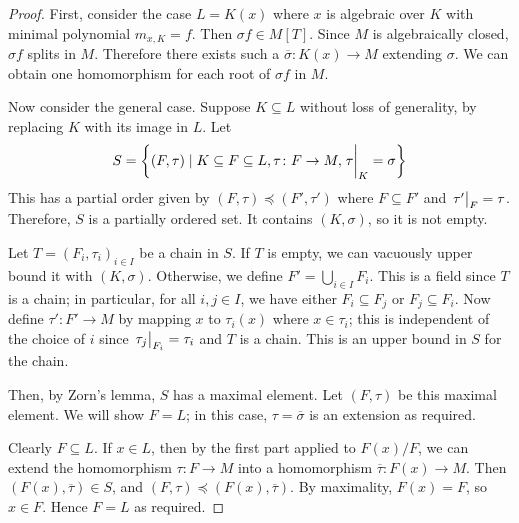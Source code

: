 \begin{proof}
	First, consider the case \( L = K(x) \) where \( x \) is algebraic over \( K \) with minimal polynomial \( m_{x,K} = f \).
	Then \( \sigma f \in M[T] \).
	Since \( M \) is algebraically closed, \( \sigma f \) splits in \( M \).
	Therefore there exists such a \( \overline \sigma \colon K(x) \to M \) extending \( \sigma \).
	We can obtain one homomorphism for each root of \( \sigma f \) in \( M \).

	Now consider the general case.
	Suppose \( K \subseteq L \) without loss of generality, by replacing \( K \) with its image in \( L \).
	Let
	\[ S = \qty{(F,\tau) \mid K \subseteq F \subseteq L, \tau \colon F \to M, \eval{\tau}_K = \sigma} \]
	This has a partial order given by \( (F,\tau) \preceq (F',\tau') \) where \( F \subseteq F' \) and \( \eval{\tau'}_F = \tau \).
	Therefore, \( S \) is a partially ordered set.
	It contains \( (K, \sigma) \), so it is not empty.

	Let \( T = (F_i, \tau_i)_{i \in I} \) be a chain in \( S \).
	If \( T \) is empty, we can vacuously upper bound it with \( (K, \sigma) \).
	Otherwise, we define \( F' = \bigcup_{i \in I} F_i \).
	This is a field since \( T \) is a chain; in particular, for all \( i, j \in I \), we have either \( F_i \subseteq F_j \) or \( F_j \subseteq F_i \).
	Now define \( \tau' \colon F' \to M \) by mapping \( x \) to \( \tau_i(x) \) where \( x \in \tau_i \); this is independent of the choice of \( i \) since \( \eval{\tau_j}_{F_i} = \tau_i \) and \( T \) is a chain.
	This is an upper bound in \( S \) for the chain.

	Then, by Zorn's lemma, \( S \) has a maximal element.
	Let \( (F, \tau) \) be this maximal element.
	We will show \( F = L \); in this case, \( \tau = \overline \sigma \) is an extension as required.

	Clearly \( F \subseteq L \).
	If \( x \in L \), then by the first part applied to \( F(x) / F \), we can extend the homomorphism \( \tau \colon F \to M \) into a homomorphism \( \overline \tau \colon F(x) \to M \).
	Then \( (F(x), \overline \tau) \in S \), and \( (F,\tau) \preceq (F(x), \overline \tau) \).
	By maximality, \( F(x) = F \), so \( x \in F \).
	Hence \( F = L \) as required.
\end{proof}

